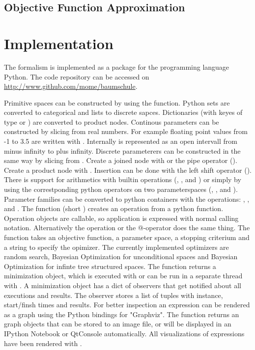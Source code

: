 \documentclass[english]{article}
\begin{document}
\subsection{Objective Function Approximation}


\section{Implementation}
The formalism is implemented as a package for the programming language Python. The code repository can be accessed on \url{http://www.github.com/mome/baumschule}.

Primitive spaces can be constructed by using the  function. Python sets are converted to categorical and lists to discrete sapces. Dictionaries (with keyes of type  or ) are converted to product nodes. Continous parameters can be constructed by slicing from real numbers. For example floating point values from -1 to 3.5 are written with . Internally  is represented as an open intervall from minus infinity to plus infinity. Discrete parameterers can be constructed in the same way by slicing from . Create a joined node with  or the pipe operator (\python{|}). Create a product node with . Insertion can be done with the left shift operator (\python{<<}). There is support for arithmetics with builtin operations (, ,  and ) or simply by using the correstponding python operators on two parameterspaces (\python{+}, \python{-}, \python{*} and \python{/}). Parameter families can be converted to python containers with the operations: , ,  and .
The  function (short ) creates an operation from a python function. Operation objects are callable, so application is expressed with normal calling notation. Alternatively the  operation or the @-operator does the same thing. The  function takes an objective function, a parameter space, a stopping criterium and a string to specify the opimizer.  The currently implemented optimizers are random search, Bayesian Optimization for unconditional spaces and Bayesian Optimization for infinte tree structured spaces. The  function returns a minimization object, which is executed with  or can be run in a separate thread with . A minimization object has a dict of observers that get notified about all executions and results. The  observer stores a list of tuples with instance, start/finsh times and results.
For better inspection an expression can be rendered as a graph using the Python bindings for "Graphviz". The  function returns an graph objects that can be stored to an image file, or will be displayed in an IPython Notebook or QtConsole automatically. All visualizations of expressions have been rendered with .
\end{document}
